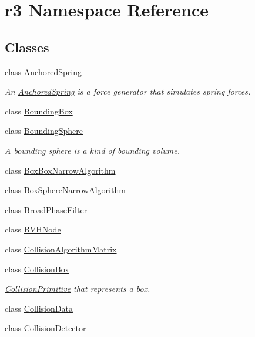 \hypertarget{namespacer3}{}\section{r3 Namespace Reference}
\label{namespacer3}
\subsection*{Classes}
\begin{DoxyCompactItemize}
\item 
class \mbox{\hyperlink{classr3_1_1_anchored_spring}{Anchored\+Spring}}
\begin{DoxyCompactList}\small\item\em An \mbox{\hyperlink{classr3_1_1_anchored_spring}{Anchored\+Spring}} is a force generator that simulates spring forces. \end{DoxyCompactList}\item 
class \mbox{\hyperlink{classr3_1_1_bounding_box}{Bounding\+Box}}
\item 
class \mbox{\hyperlink{classr3_1_1_bounding_sphere}{Bounding\+Sphere}}
\begin{DoxyCompactList}\small\item\em A bounding sphere is a kind of bounding volume. \end{DoxyCompactList}\item 
class \mbox{\hyperlink{classr3_1_1_box_box_narrow_algorithm}{Box\+Box\+Narrow\+Algorithm}}
\item 
class \mbox{\hyperlink{classr3_1_1_box_sphere_narrow_algorithm}{Box\+Sphere\+Narrow\+Algorithm}}
\item 
class \mbox{\hyperlink{classr3_1_1_broad_phase_filter}{Broad\+Phase\+Filter}}
\item 
class \mbox{\hyperlink{classr3_1_1_b_v_h_node}{B\+V\+H\+Node}}
\item 
class \mbox{\hyperlink{classr3_1_1_collision_algorithm_matrix}{Collision\+Algorithm\+Matrix}}
\item 
class \mbox{\hyperlink{classr3_1_1_collision_box}{Collision\+Box}}
\begin{DoxyCompactList}\small\item\em \mbox{\hyperlink{classr3_1_1_collision_primitive}{Collision\+Primitive}} that represents a box. \end{DoxyCompactList}\item 
class \mbox{\hyperlink{classr3_1_1_collision_data}{Collision\+Data}}
\item 
class \mbox{\hyperlink{classr3_1_1_collision_detector}{Collision\+Detector}}

\end{DoxyCompactItemize}
